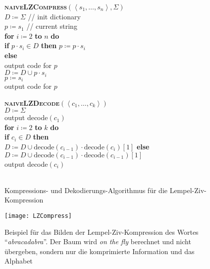 \begin{figure}[H]
  \begin{minipage}{.42\textwidth}
    \begin{pseudocode}
      \textbf{\textsc{naiveLZCompress}}\( (\left\langle s_1,\dots,s_n \right\rangle, \Sigma) \) \\
      \( D \coloneqq \Sigma \) \quad // init dictionary \\
      \( p \coloneqq s_1 \) \quad // current string \\
      \textbf{for} \( i \coloneqq 2 \) \textbf{to} \( n \) \textbf{do} \\
      \phantom{\enskip} \textbf{if} \( p \cdot s_i \in D \) \textbf{then} \( p \coloneqq p \cdot s_i \) \\
      \phantom{\enskip} \textbf{else} \\
      \phantom{\enskip} \phantom{\enskip} output code for \( p \) \\
      \phantom{\enskip} \phantom{\enskip} \( D \coloneqq D \cup p \cdot s_i \) \\
      \phantom{\enskip} \phantom{\enskip} \( p \coloneqq s_i \) \\
      output code for \( p \)
    \end{pseudocode}
  \end{minipage}
  \begin{minipage}{.55\textwidth}
    \begin{pseudocode}
      \textbf{\textsc{naiveLZDecode}}\( (\left\langle c_1,\dots,c_k \right\rangle) \) \\
      \( D \coloneqq \Sigma \) \\
      output decode\( (c_1) \) \\
      \textbf{for} \( i \coloneqq 2 \) \textbf{to} \( k \) \textbf{do} \\
      \phantom{\enskip} \textbf{if} \( c_i \in D \) \textbf{then} \\
      \phantom{\enskip} \phantom{\enskip} \( D \coloneqq D \cup \text{decode}(c_{i-1}) \cdot \text{decode}(c_i)[1] \)
      \phantom{\enskip} \textbf{else} \\
      \phantom{\enskip} \phantom{\enskip} \( D \coloneqq D \cup \text{decode}(c_{i-1}) \cdot \text{decode}(c_{i-1})[1] \) \\
      \phantom{\enskip} output decode\( (c_i) \) \\
      \ 
    \end{pseudocode}
  \end{minipage}
  \caption{Kompressions- und Dekodierungs-Algorithmus für die Lempel-Ziv-Kompression}
\end{figure}

\begin{figure}[H]
  \texttt{[image: LZCompress]}
  \captionsetup{width=.6\textwidth}
  \caption{Beispiel für das Bilden der Lempel-Ziv-Kompression des Wortes ``\emph{abracadabra}''. Der Baum wird \emph{on the fly} berechnet und nicht übergeben, sondern nur die komprimierte Information und das Alphabet}
\end{figure}
